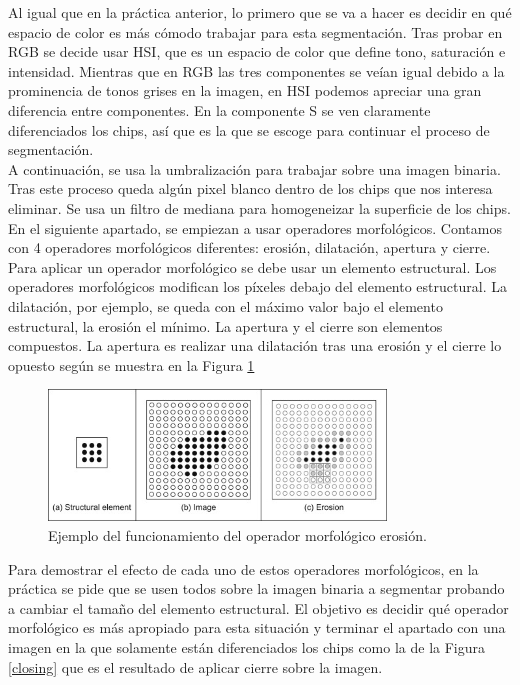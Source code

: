 Al igual que en la práctica anterior, lo primero que se va a hacer es decidir en qué espacio de color es más cómodo trabajar para esta segmentación. Tras probar en RGB se decide usar HSI, que es un espacio de color que define tono, saturación e intensidad. Mientras que en RGB las tres componentes se veían igual debido a la prominencia de tonos grises en la imagen, en HSI podemos apreciar una gran diferencia entre componentes. En la componente S se ven claramente diferenciados los chips, así que es la que se escoge para continuar el proceso de segmentación.\\

A continuación, se usa la umbralización para trabajar sobre una imagen binaria. Tras este proceso queda algún pixel blanco dentro de los chips que nos interesa eliminar. Se usa un filtro de mediana para homogeneizar la superficie de los chips.\\

En el siguiente apartado, se empiezan a usar operadores morfológicos. Contamos con 4 operadores morfológicos diferentes: erosión, dilatación, apertura y cierre. Para aplicar un operador morfológico se debe usar un elemento estructural. Los operadores morfológicos modifican los píxeles debajo del elemento estructural. La dilatación, por ejemplo, se queda con el máximo valor bajo el elemento estructural, la erosión el mínimo. La apertura y el cierre son elementos compuestos. La apertura es realizar una dilatación tras una erosión y el cierre lo opuesto según se muestra en la Figura \ref{erosion}\\

\begin{figure}[h]
\centering
\includegraphics[width=0.8\textwidth]{imagenes/erosion}
\caption{Ejemplo del funcionamiento del operador morfológico erosión.}
\label{erosion}
\end{figure}

Para demostrar el efecto de cada uno de estos operadores morfológicos, en la práctica se pide que se usen todos sobre la imagen binaria a segmentar probando a cambiar el tamaño del elemento estructural. El objetivo es decidir qué operador morfológico es más apropiado para esta situación y terminar el apartado con una imagen en la que solamente están diferenciados los chips como la de la Figura \ref{closing} que es el resultado de aplicar cierre sobre la imagen.\\

